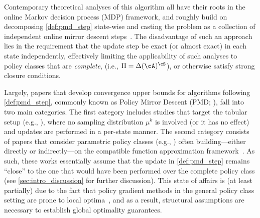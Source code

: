 Contemporary theoretical analyses of this algorithm \citep{shani2020adaptive,agarwal2021theory,xiao2022convergence,ju2022policy,zhan2023policy, yuan2023loglinear,alfano2023novel} all have their roots in the online Markov decision process (MDP) framework, and roughly build on decomposing \cref{def:pmd_step} state-wise and casting the problem as a collection of independent online mirror descent 
steps~\citep{even2009online}. The disadvantage of such an approach lies in the requirement that the update step be exact (or almost exact) in each state independently, effectively limiting the applicability of such analyses to policy classes that are \emph{complete}, (i.e., $\Pi = \Delta(\cA)^\cS$), or otherwise satisfy strong closure conditions.

Largely, papers that develop convergence upper bounds for algorithms following \cref{def:pmd_step}, commonly known as Policy Mirror Descent (PMD; \citealp{tomar2020mirror,xiao2022convergence,lan2023policy}), fall into two main categories. The first category includes studies that target the tabular setup (e.g., \citealp{geist2019theory,shani2020adaptive,agarwal2021theory,xiao2022convergence,johnson2023optimal,lan2023policy,zhan2023policy}), where no sampling distribution $\mu^k$ is involved (or it has no effect) and updates are performed in a per-state manner. The second category consists of papers that consider parametric policy classes (e.g., \citealp{agarwal2021theory,alfano2022linear,ju2022policy,yuan2023loglinear,alfano2023novel,xiong2024dual}) often building---either directly or indirectly---on the compatible function approximation framework~\citep{sutton1999policy}. 
As such, these works essentially assume that the update in \cref{def:pmd_step} remains ``close'' to the one that would have been performed over the complete policy class (see  \cref{sec:intro_discussion} for further discussion).
% 
This state of affairs is (at least partially) due to the fact that policy gradient methods in the general policy class setting are prone to local optima~\citep{bhandari2024global}, and as a result, structural assumptions are necessary to establish global optimality guarantees.

